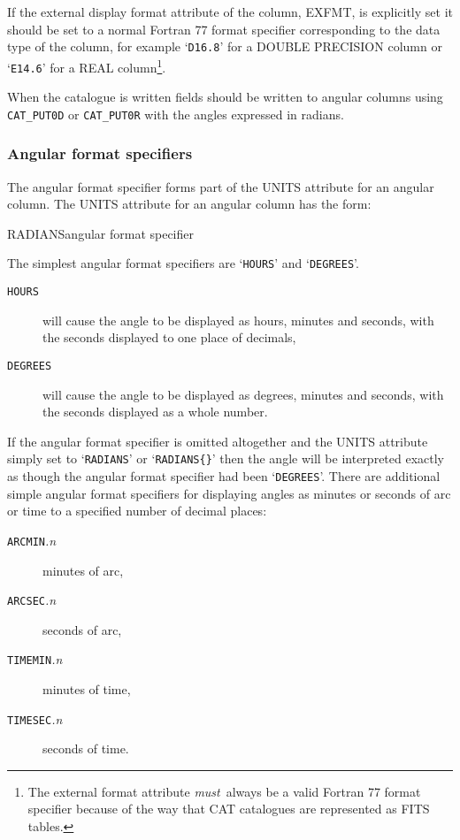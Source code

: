 \documentclass[11pt,twoside]{starlink}
\begin{document}
If the external display format attribute of the column, EXFMT,
is explicitly set it should be set to a normal Fortran 77 format
specifier corresponding to the data type of the column, for
example `\texttt{D16.8}' for a DOUBLE PRECISION column or `\texttt{E14.6}'
for a REAL column\footnote{The external format attribute \textit{must}\, always be a valid Fortran 77 format specifier because of
the way that CAT catalogues are represented as FITS tables.}.

When the catalogue is written fields should be written to
angular columns using \texttt{CAT\_PUT0D} or \texttt{CAT\_PUT0R} with
the angles expressed in radians.

\subsubsection{Angular format specifiers}

The angular format specifier forms part of the UNITS attribute for an
angular column. The UNITS attribute for an angular column has the
form:

\begin{terminalv}
RADIANS{angular format specifier}
\end{terminalv}

The simplest angular format specifiers are `\texttt{HOURS}' and
`\texttt{DEGREES}'.

\begin{description}

  \item[\texttt{HOURS}] will cause the angle to be displayed as
   hours, minutes and seconds, with the seconds displayed to one
   place of decimals,

  \item[\texttt{DEGREES}] will cause the angle to be displayed as
   degrees, minutes and seconds, with the seconds displayed as a
   whole number.

\end{description}

If the angular format specifier is omitted altogether and
the UNITS attribute simply set to `\texttt{RADIANS}' or `\texttt{RADIANS\{\}}' then the angle will be interpreted exactly as
though the angular format specifier had been `\texttt{DEGREES}'.
There are additional simple angular format specifiers for displaying
angles as minutes or seconds of arc or time to a specified number of
decimal places:

\begin{description}

  \item[\texttt{ARCMIN}\textit{.n}] minutes of arc,

  \item[\texttt{ARCSEC}\textit{.n}] seconds of arc,

  \item[\texttt{TIMEMIN}\textit{.n}] minutes of time,

  \item[\texttt{TIMESEC}\textit{.n}] seconds of time.


\end{description}
\end{document}
